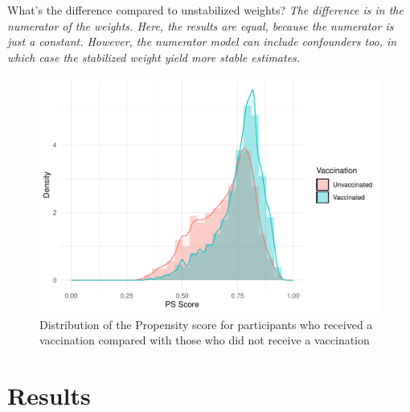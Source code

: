 \documentclass[
]{article}
\begin{document}
What's the difference compared to unstabilized weights? \emph{The difference is in the numerator of the weights. Here, the results are equal, because the numerator is just a constant. However, the numerator model can include confounders too, in which case the stabilized weight yield more stable estimates.}

\begin{figure}
\includegraphics[width=0.7\linewidth]{Assignment_files/figure-latex/psscore-1} \caption{Distribution of the Propensity score for participants who received a vaccination compared with those who did not receive a vaccination}\label{fig:psscore}
\end{figure}

\hypertarget{results}{%
\section{Results}\label{results}}
\end{document}
